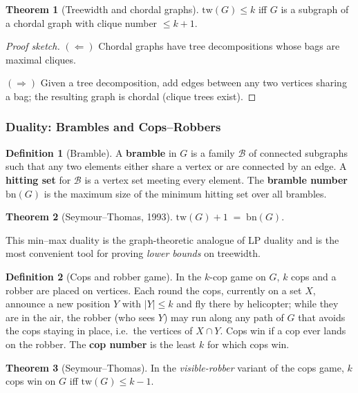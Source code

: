 \documentclass{article}
\theoremstyle{definition}
\newtheorem{theorem}{Theorem}
\newtheorem{definition}{Definition}
\begin{document}
\begin{theorem}[Treewidth and chordal graphs]\label{thm:chordaltw}
$\mathrm{tw}(G) \le k$ iff $G$ is a subgraph of a chordal graph with
clique number $\le k + 1$.
\end{theorem}

\begin{proof}[Proof sketch]
$(\Leftarrow)$ Chordal graphs have tree decompositions whose bags are
maximal cliques.

$(\Rightarrow)$ Given a tree decomposition, add edges between any two
vertices sharing a bag; the resulting graph is chordal (clique trees
exist).
\end{proof}

\subsubsection{Duality: Brambles and Cops--Robbers}

\begin{definition}[Bramble]\label{def:bramble}
A \textbf{bramble} in $G$ is a family $\mathcal{B}$ of connected
subgraphs such that any two elements either share a vertex or are
connected by an edge. A \textbf{hitting set} for $\mathcal{B}$ is a
vertex set meeting every element. The \textbf{bramble number}
$\mathrm{bn}(G)$ is the maximum size of the minimum hitting set over
all brambles.
\end{definition}

\begin{theorem}[Seymour--Thomas, 1993]\label{thm:brambleduality}
$\mathrm{tw}(G) + 1 \;=\; \mathrm{bn}(G)$.
\end{theorem}

This min--max duality is the graph-theoretic analogue of LP duality
and is the most convenient tool for proving \emph{lower bounds} on
treewidth.

\begin{definition}[Cops and robber game]
In the $k$-cop game on $G$, $k$ cops and a robber are placed on
vertices. Each round the cops, currently on a set $X$, announce a new
position $Y$ with $|Y| \le k$ and fly there by helicopter; while they are
in the air, the robber (who sees $Y$) may run along any path of $G$ that
avoids the cops staying in place, i.e.\ the vertices of $X \cap Y$.
Cops win if a cop ever lands on the robber. The
\textbf{cop number} is the least $k$ for which cops win.
\end{definition}

\begin{theorem}[Seymour--Thomas]\label{thm:copstw}
In the \emph{visible-robber} variant of the cops game,
$k$ cops win on $G$ iff $\mathrm{tw}(G) \le k - 1$.
\end{theorem}
\end{document}
